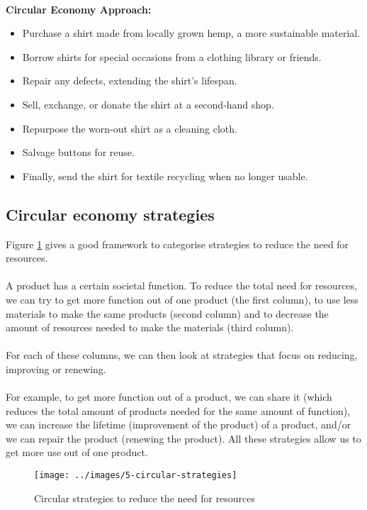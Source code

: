 \documentclass[../summary.tex]{subfiles}
\begin{document}
\ \\
\textbf{Circular Economy Approach:}
\begin{itemize}
	\itemsep0em
	\item Purchase a shirt made from locally grown hemp, a more sustainable material.
	\item Borrow shirts for special occasions from a clothing library or friends.
	\item Repair any defects, extending the shirt's lifespan.
	\item Sell, exchange, or donate the shirt at a second-hand shop.
	\item Repurpose the worn-out shirt as a cleaning cloth.
	\item Salvage buttons for reuse.
	\item Finally, send the shirt for textile recycling when no longer usable.
\end{itemize}
\newpage
\subsection{Circular economy strategies}

Figure \ref{fig:circular-strategies} gives a good framework to categorise strategies to reduce the need for resources.
\\\\
A product has a certain societal function. To reduce the total need for resources, we can try to get more function out of one product (the first column), to use less materials to make the same products (second column) and to decrease the amount of resources needed to make the materials (third column).
\\\\
For each of these columns, we can then look at strategies that focus on reducing, improving or renewing.
\\\\
For example, to get more function out of a product, we can share it (which reduces the total amount of products needed for the same amount of function), we can increase the lifetime (improvement of the product) of a product, and/or we can repair the product (renewing the product). All these strategies allow us to get more use out of one product.

\begin{figure}[H]
	\centering
	\texttt{[image: ../images/5-circular-strategies]}
	\caption{Circular strategies to reduce the need for resources}
	\label{fig:circular-strategies}
\end{figure}
\end{document}
